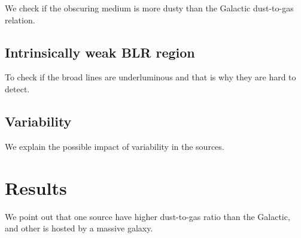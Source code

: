 We check if the obscuring medium is more dusty than the Galactic dust-to-gas relation.


\subsection{Intrinsically weak BLR region}
\label{sec4:blr}

To check if the broad lines are underluminous and that is why they are hard to detect.


\subsection{Variability}
\label{sec4:var}

We explain the possible impact of variability in the sources.


\section{Results}
\label{sec4:res}

We point out that one source have higher dust-to-gas ratio than the Galactic, and other is hosted by a massive galaxy.



